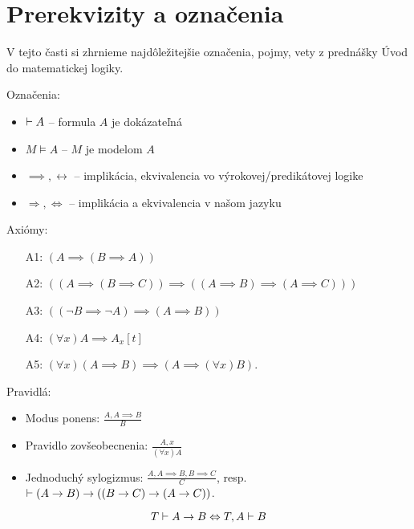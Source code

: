 \section{Prerekvizity a označenia}

V tejto časti si zhrnieme najdôležitejšie označenia, pojmy, vety z
prednášky Úvod do matematickej logiky.

\noindent Označenia:
\begin{itemize}
    \item $\vdash A$ -- formula $A$ je dokázateľná
    \item $M \models A$ -- $M$ je modelom $A$
    \item $\implies, \leftrightarrow$ -- implikácia, ekvivalencia vo
    výrokovej/predikátovej logike
    \item $\Rightarrow, \Leftrightarrow$ -- implikácia a ekvivalencia v
    našom jazyku
\end{itemize}

\noindent Axiómy:
\begin{itemize}
    \item[A1:] $(A \implies (B \implies A))$
    \item[A2:] $((A \implies (B \implies C)) \implies 
                ((A \implies B) \implies (A \implies C)))$
    \item[A3:] $((\neg B \implies \neg A) \implies (A \implies B))$
    \vskip 0.5cm
    \item[A4:] $(\forall x) A \implies A_x[t]$
    \item[A5:] $(\forall x) (A \implies B) \implies (A \implies
    (\forall x) B)$.
\end{itemize}

\noindent Pravidlá:
\begin{itemize}
    \item Modus ponens: $\displaystyle \frac{A,A\implies B}{B}$
    \item Pravidlo zovšeobecnenia:
            $\displaystyle \frac{A,x}{(\forall x)A}$
    \item Jednoduchý sylogizmus:
            $\displaystyle \frac{A, A\implies B, B\implies C}{C}$, resp.
            $\vdash (A \rightarrow B) \rightarrow ((B \rightarrow C) 
                \rightarrow (A \rightarrow C))$.
\end{itemize}

\begin{veta}[O dedukcii]
    \begin{equation*}
        T \vdash A \rightarrow B \Leftrightarrow T,A \vdash B
    \end{equation*}
\end{veta}

